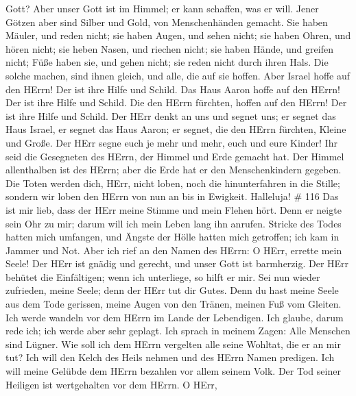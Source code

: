 Gott?  Aber unser Gott ist im Himmel; er kann schaffen, was
er will.  Jener Götzen aber sind Silber und Gold, von
Menschenhänden gemacht.  Sie haben Mäuler, und reden nicht;
sie haben Augen, und sehen nicht;  sie haben Ohren, und
hören nicht; sie heben Nasen, und riechen nicht;  sie haben
Hände, und greifen nicht; Füße haben sie, und gehen nicht; sie reden
nicht durch ihren Hals.  Die solche machen, sind ihnen
gleich, und alle, die auf sie hoffen.  Aber Israel hoffe auf
den HErrn! Der ist ihre Hilfe und Schild.  Das Haus Aaron
hoffe auf den HErrn! Der ist ihre Hilfe und Schild.  Die
den HErrn fürchten, hoffen auf den HErrn! Der ist ihre Hilfe und Schild.
 Der HErr denkt an uns und segnet uns; er segnet das Haus
Israel, er segnet das Haus Aaron;  er segnet, die den HErrn
fürchten, Kleine und Große.  Der HErr segne euch je mehr
und mehr, euch und eure Kinder!  Ihr seid die Gesegneten
des HErrn, der Himmel und Erde gemacht hat.  Der Himmel
allenthalben ist des HErrn; aber die Erde hat er den Menschenkindern
gegeben.  Die Toten werden dich, HErr, nicht loben, noch
die hinunterfahren in die Stille;  sondern wir loben den
HErrn von nun an bis in Ewigkeit. Halleluja! \# 116  Das ist
mir lieb, dass der HErr meine Stimme und mein Flehen hört. 
Denn er neigte sein Ohr zu mir; darum will ich mein Leben lang ihn
anrufen.  Stricke des Todes hatten mich umfangen, und Ängste
der Hölle hatten mich getroffen; ich kam in Jammer und Not. 
Aber ich rief an den Namen des HErrn: O HErr, errette mein Seele!
 Der HErr ist gnädig und gerecht, und unser Gott ist
barmherzig.  Der HErr behütet die Einfältigen; wenn ich
unterliege, so hilft er mir.  Sei nun wieder zufrieden,
meine Seele; denn der HErr tut dir Gutes.  Denn du hast
meine Seele aus dem Tode gerissen, meine Augen von den Tränen, meinen
Fuß vom Gleiten.  Ich werde wandeln vor dem HErrn im Lande
der Lebendigen.  Ich glaube, darum rede ich; ich werde aber
sehr geplagt.  Ich sprach in meinem Zagen: Alle Menschen
sind Lügner.  Wie soll ich dem HErrn vergelten alle seine
Wohltat, die er an mir tut?  Ich will den Kelch des Heils
nehmen und des HErrn Namen predigen.  Ich will meine
Gelübde dem HErrn bezahlen vor allem seinem Volk.  Der Tod
seiner Heiligen ist wertgehalten vor dem HErrn.  O HErr,

